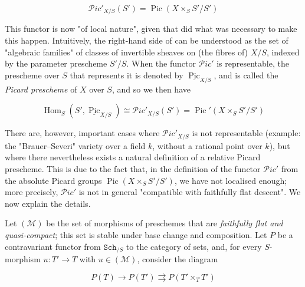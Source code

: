 \begin{equation}\tag{1.3}\label{fga3.v-1-equation-1.3}
    \mathcal{P}ic'_{X/S}(S') = \operatorname{Pic}(X\times_S S'/S')
\end{equation}

This functor is now "of local nature", given that did what was necessary to make this happen.
Intuitively, the right-hand side of  can be understood as the set of "algebraic families" of classes of invertible sheaves on (the fibres of) $X/S$, indexed by the parameter prescheme $S'/S$.
When the functor $\mathcal{P}ic'$ is representable, the prescheme over $S$ that represents it is denoted by $\underline{\operatorname{Pic}}_{X/S}$, and is called the \emph{Picard prescheme} of $X$ over $S$, and so we then have

\begin{equation}\tag{1.4}\label{fga3.v-1-equation-1.4}
    \operatorname{Hom}_S(S',\underline{\operatorname{Pic}}_{X/S})
    \cong \mathcal{P}ic'_{X/S}(S')
    = \operatorname{Pic}'(X\times_S S'/S')
\end{equation}

There are, however, important cases where $\mathcal{P}ic'_{X/S}$ is not representable (example: the "Brauer–Severi" variety over a field $k$, without a rational point over $k$), but where there nevertheless exists a natural definition of a relative Picard prescheme.
This is due to the fact that, in the definition of the functor $\mathcal{P}ic'$ from the absolute Picard groups $\operatorname{Pic}(X\times_S S'/S')$, we have not localised enough;
more precisely, $\mathcal{P}ic'$ is not in general "compatible with faithfully flat descent".
We now explain the details.

Let $(\mathcal{M})$ be the set of morphisms of preschemes that are \emph{faithfully flat and quasi-compact};
this set is stable under base change and composition.
Let $P$ be a contravariant functor from $\mathtt{Sch}_{/S}$ to the category of sets, and, for every $S$-morphism $u\colon T'\to T$ with $u\in(\mathcal{M})$, consider the diagram

\begin{equation}\tag{1.5}\label{fga3.v-1-equation-1.5}
    P(T)
    \to P(T')
    \rightrightarrows P(T'\times_T T')
\end{equation}

